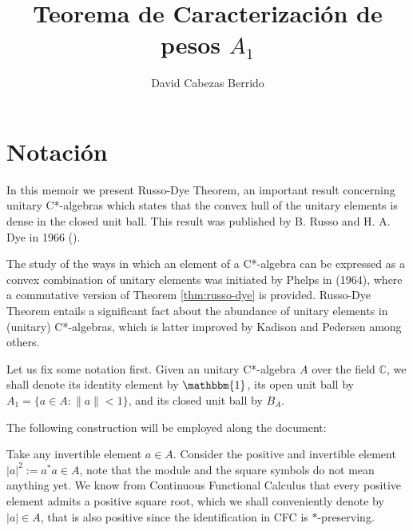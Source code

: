 \documentclass[12pt,english]{article}
\title{Teorema de Caracterización de pesos $A_1$}
\author{David Cabezas Berrido}
\date{}
\theoremstyle{definition}
\theoremstyle{remark}
\begin{document}
\maketitle

\section*{Notación}

In this memoir we present Russo-Dye Theorem, an important result concerning unitary C*-algebras which states that the convex hull of the unitary elements is dense in the closed unit ball. This result was published by B. Russo and H. A. Dye in 1966 (\cite{russo-dye}).

The study of the ways in which an element of a C*-algebra can be expressed as a convex combination of unitary elements was initiated by Phelps in \cite{phelps} (1964), where a commutative version of Theorem \ref{thm:russo-dye} is provided. Russo-Dye Theorem entails a significant fact about the abundance of unitary elements in (unitary) C*-algebras, which is latter improved by Kadison and Pedersen among others.

Let us fix some notation first. Given an unitary C*-algebra $A$ over the field $\mathbb{C}$, we shall denote its identity element by $\mathbbm{1}$, its open unit ball by $A_1=\{a\in A: \|a\|<1\}$, and its closed unit ball by $B_A$.

The following construction will be employed along the document:

Take any invertible element $a\in A$. Consider the positive and invertible element $|a|^2:=a^*a\in A$, note that the module and the square symbols do not mean anything yet. We know from Continuous Functional Calculus that every positive element admits a positive square root, which we shall conveniently denote by $|a|\in A$, that is also positive since the identification in CFC is $*$-preserving.
\end{document}
